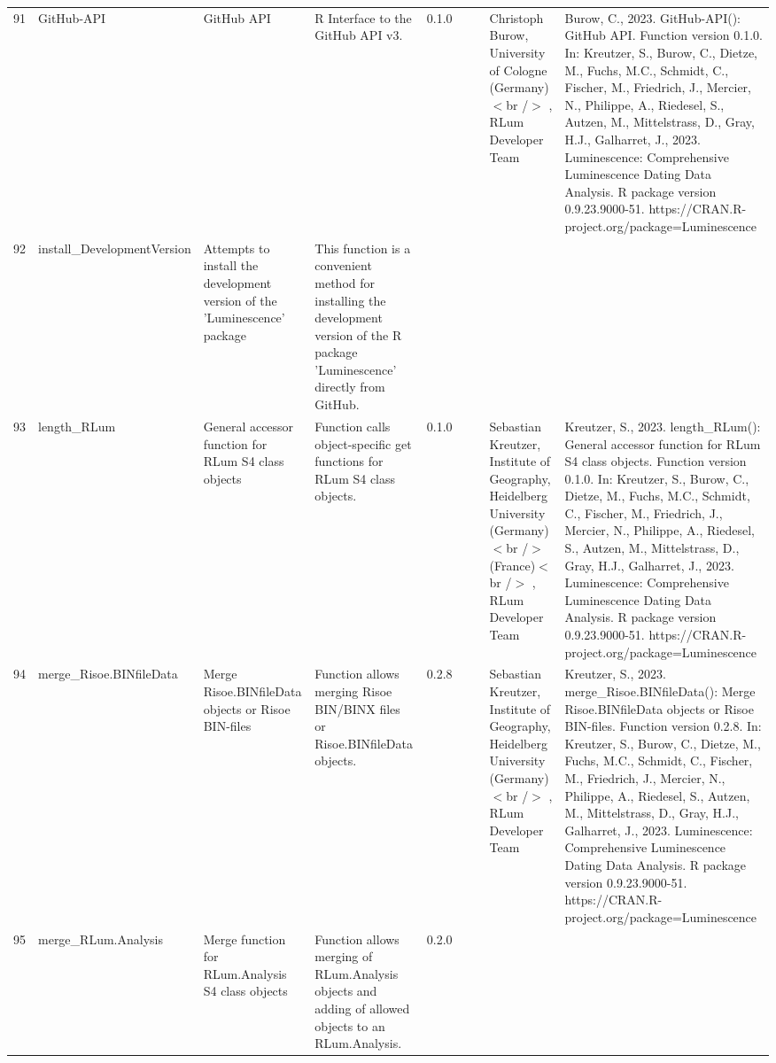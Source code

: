 \begin{table}[ht]
\begin{tabular}{rllllllll}
 \\ 
  91 & GitHub-API & GitHub API & R Interface to the GitHub API v3. & 0.1.0
 &  &  & Christoph Burow, University of Cologne (Germany)$<$br /$>$ , RLum Developer Team & Burow, C., 2023. GitHub-API(): GitHub API. Function version 0.1.0. In: Kreutzer, S., Burow, C., Dietze, M., Fuchs, M.C., Schmidt, C., Fischer, M., Friedrich, J., Mercier, N., Philippe, A., Riedesel, S., Autzen, M., Mittelstrass, D., Gray, H.J., Galharret, J., 2023. Luminescence: Comprehensive Luminescence Dating Data Analysis. R package version 0.9.23.9000-51. https://CRAN.R-project.org/package=Luminescence
 \\ 
  92 & install\_DevelopmentVersion & Attempts to install the development version of the 'Luminescence' package & This function is a convenient method for installing the development version of the R package 'Luminescence' directly from GitHub. &  &  &  &  &  \\ 
  93 & length\_RLum & General accessor function for RLum S4 class objects & Function calls object-specific get functions for RLum S4 class objects. & 0.1.0
 &  &  & Sebastian Kreutzer, Institute of Geography, Heidelberg University (Germany)$<$br /$>$ (France)$<$br /$>$ , RLum Developer Team & Kreutzer, S., 2023. length\_RLum(): General accessor function for RLum S4 class objects. Function version 0.1.0. In: Kreutzer, S., Burow, C., Dietze, M., Fuchs, M.C., Schmidt, C., Fischer, M., Friedrich, J., Mercier, N., Philippe, A., Riedesel, S., Autzen, M., Mittelstrass, D., Gray, H.J., Galharret, J., 2023. Luminescence: Comprehensive Luminescence Dating Data Analysis. R package version 0.9.23.9000-51. https://CRAN.R-project.org/package=Luminescence
 \\ 
  94 & merge\_Risoe.BINfileData & Merge Risoe.BINfileData objects or Risoe BIN-files & Function allows merging Risoe BIN/BINX files or  Risoe.BINfileData  objects. & 0.2.8
 &  &  & Sebastian Kreutzer, Institute of Geography, Heidelberg University (Germany)$<$br /$>$ , RLum Developer Team & Kreutzer, S., 2023. merge\_Risoe.BINfileData(): Merge Risoe.BINfileData objects or Risoe BIN-files. Function version 0.2.8. In: Kreutzer, S., Burow, C., Dietze, M., Fuchs, M.C., Schmidt, C., Fischer, M., Friedrich, J., Mercier, N., Philippe, A., Riedesel, S., Autzen, M., Mittelstrass, D., Gray, H.J., Galharret, J., 2023. Luminescence: Comprehensive Luminescence Dating Data Analysis. R package version 0.9.23.9000-51. https://CRAN.R-project.org/package=Luminescence
 \\ 
  95 & merge\_RLum.Analysis & Merge function for RLum.Analysis S4 class objects & Function allows merging of RLum.Analysis objects and adding of allowed objects to an RLum.Analysis. & 0.2.0

\end{tabular}
\end{table}
